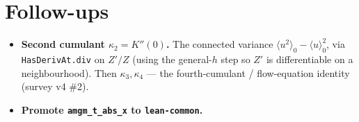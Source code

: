 \documentclass[11pt]{article}
\begin{document}
\section{Follow-ups}

\begin{itemize}[itemsep=3pt]
\item \textbf{Second cumulant $\kappa_2=K''(0)$.} The connected variance
  $\langle u^2\rangle_0-\langle u\rangle_0^2$, via \texttt{HasDerivAt.div} on
  $Z'/Z$ (using the general-$h$ step so $Z'$ is differentiable on a
  neighbourhood). Then $\kappa_3,\kappa_4$ --- the fourth-cumulant /
  flow-equation identity (survey v4 \#2).
\item \textbf{Promote \texttt{amgm\_t\_abs\_x} to \texttt{lean-common}.}
\end{itemize}
\end{document}
